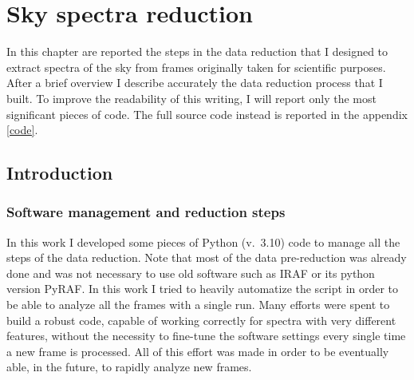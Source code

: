 \chapter{Sky spectra reduction}

In this chapter are reported the steps in the data reduction that I designed to extract spectra of the sky from frames originally taken for scientific purposes. After a brief overview I describe accurately the data reduction process that I built. To improve the readability of this writing, I will report only the most significant pieces of code. The full source code instead is reported in the appendix \ref{code}.

\section{Introduction}

\subsection{Software management and reduction steps}
In this work I developed some pieces of Python (v.\ 3.10) code to manage all the steps of the data reduction. Note that most of the data pre-reduction was already done and was not necessary to use old software such as IRAF or its python version PyRAF. In this work I tried to heavily automatize the script in order to be able to analyze all the frames with a single run. Many efforts were spent to build a robust code, capable of working correctly for spectra with very different features, without the necessity to fine-tune the software settings every single time a new frame is processed. All of this effort was made in order to be eventually able, in the future, to rapidly analyze new frames.

